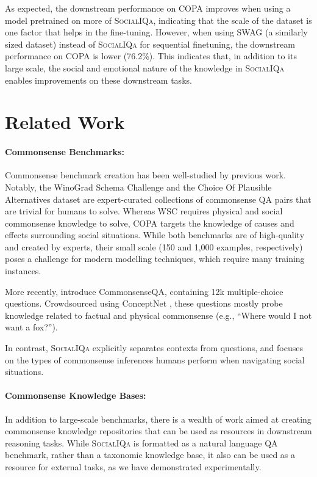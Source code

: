 As expected, the downstream performance on COPA improves when using a model pretrained on more of \textsc{SocialIQa}, indicating that the scale of the dataset is one factor that helps in the fine-tuning. However, when using SWAG (a similarly sized dataset) instead of \textsc{SocialIQa} for sequential finetuning, the downstream performance on COPA is lower (76.2\%).
This indicates that, in addition to its large scale, the social and emotional nature of the knowledge in \textsc{SocialIQa} enables improvements on these downstream tasks.

\section{Related Work}

\paragraph{Commonsense Benchmarks:} 

Commonsense benchmark creation has been well-studied by previous work. Notably, the WinoGrad Schema Challenge \cite[WSC;][]{Levesque2011TheWS} and the Choice Of Plausible Alternatives dataset  \cite[COPA;][]{Roemmele2011ChoiceOP} are expert-curated collections of commonsense QA pairs that are trivial for humans to solve. Whereas WSC requires physical and social commonsense knowledge to solve, COPA targets the knowledge of causes and effects surrounding social situations. While both benchmarks are of high-quality and created by experts, their small scale (150 and 1,000 examples, respectively) poses a challenge for modern modelling techniques, which require many training instances.

More recently, \citet{Talmor2019commonsenseQA} introduce CommonsenseQA, containing 12k multiple-choice questions. Crowdsourced using ConceptNet \cite{ConceptNet}, these questions mostly probe knowledge related to factual and physical commonsense (e.g., ``Where would I not want a fox?'').

In contrast, \textsc{SocialIQa} explicitly separates contexts from questions, and focuses on the types of commonsense inferences humans perform when navigating social situations.

\paragraph{Commonsense Knowledge Bases:}

In addition to large-scale benchmarks, there is a wealth of work aimed at creating commonsense knowledge repositories \citep{ConceptNet,sap2019atomic,zhang2017ordinal,lenat1995cyc,eventNet,gordon2017formal} that can be used as resources in downstream reasoning tasks. While \textsc{SocialIQa} is formatted as a natural language QA benchmark, rather than a taxonomic knowledge base, it also can be used as a resource for external tasks, as we have demonstrated experimentally.

